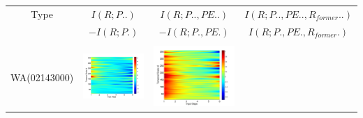 \documentclass[review]{elsarticle}
\begin{document}
\begin{table}[H]\small
\label{former}
\centering
\begin{tabular}{cccc}
\hline
Type&$I(R;P..)$&$I(R;P..,PE..) $&$I(R;P..,PE..,R_{former}..)$\\
 &$ -I(R;P.)$ &$ -I(R;P.,PE.)$&$I(R;P.,PE.,R_{former}.)$\\\hline
\\
WA(02143000)
&\begin{minipage}{.3\textwidth}\includegraphics[width=\linewidth]{resultgraph/02143000pdiff_former.png}\end{minipage}
&\begin{minipage}{.3\textwidth}\includegraphics[width=\linewidth]{resultgraph/02143000epdiff_former.png}\end{minipage}

\end{tabular}
\end{table}
\end{document}
